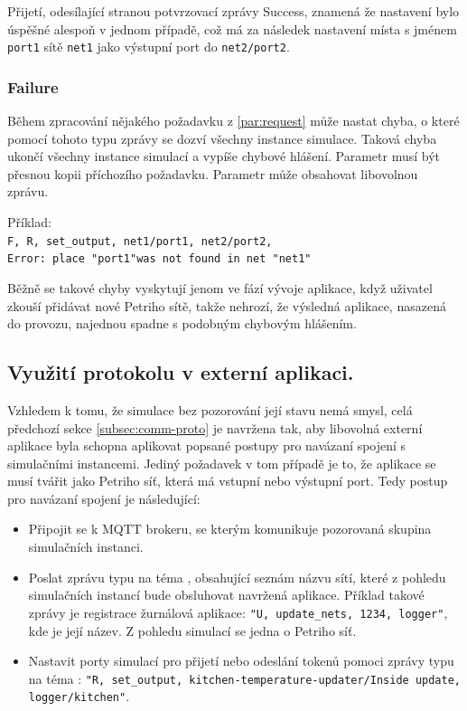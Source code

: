 Přijetí, odesílající stranou potvrzovací zprávy Success, znamená že nastavení bylo úspěšné alespoň v jednom případě, což má za následek nastavení místa s jménem \texttt{port1} sítě \texttt{net1} jako výstupní port do \texttt{net2/port2}.

\subsubsection{Failure} Během zpracování nějakého požadavku z \ref{par:request} může nastat chyba, o které pomocí tohoto typu zprávy se dozví všechny instance simulace. Taková chyba ukončí všechny instance simulací a vypíše chybové hlášení. Parametr  musí být přesnou kopii příchozího požadavku. Parametr  může obsahovat libovolnou zprávu.

\begin{tabbing}
 Příklad: \= \\
 \> \texttt{F, R, set\_output, net1/port1, net2/port2, }\\
 \> \texttt{Error: place "port1"\space was not found in net "net1"} \\
\end{tabbing}

Běžně se takové chyby vyskytují jenom ve fází vývoje aplikace, když uživatel zkouší přidávat nové Petriho sítě, takže nehrozí, že výsledná aplikace, nasazená do provozu, najednou spadne s podobným chybovým hlášením.

\subsection{Využití protokolu v externí aplikaci.}
\label{subsec:external-app}
Vzhledem k tomu, že simulace bez pozorování její stavu nemá smysl, celá předchozí sekce \ref{subsec:comm-proto} je navržena tak, aby libovolná externí aplikace byla schopna aplikovat popsané postupy pro navázaní spojení s simulačními instancemi. Jediný požadavek v tom případě je to, že aplikace se musí tvářit jako Petriho síť, která má vstupní nebo výstupní port. Tedy postup pro navázaní spojení je následující:
\begin{itemize}
  \item Připojit se k MQTT brokeru, se kterým komunikuje pozorovaná skupina simulačních instanci.
  \item Poslat zprávu typu  na téma , obsahující seznám názvu sítí, které z pohledu simulačních instancí bude obsluhovat navržená aplikace. Příklad takové zprávy je registrace žurnálová aplikace: \texttt{"U, update\_nets, 1234, logger"}, kde  je její název. Z pohledu simulací se jedna o Petriho síť.
  \item Nastavit porty simulací pro přijetí nebo odeslání tokenů pomoci zprávy typu  na téma : \texttt{"R, set\_output, kitchen-temperature-updater/Inside update, logger/kitchen"}.
\end{itemize}

